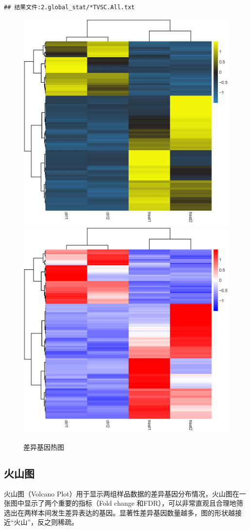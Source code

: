 \documentclass[
]{ctexart}
\begin{document}
\begin{verbatim}
## 结果文件:2.global_stat/*TVSC.All.txt
\end{verbatim}

\begin{figure}[H]

{\centering \includegraphics[width=0.48\linewidth]{./1.picture/heatmap_1} \includegraphics[width=0.48\linewidth]{./1.picture/heatmap_3} 

}

\caption{差异基因热图}\label{fig:unnamed-chunk-9}
\end{figure}

\hypertarget{ux706bux5c71ux56fe}{%
\subsection{火山图}\label{ux706bux5c71ux56fe}}

火山图（Volcano Plot）用于显示两组样品数据的差异基因分布情况，火山图在一张图中显示了两个重要的指标（Fold change 和FDR），可以非常直观且合理地筛选出在两样本间发生差异表达的基因。显著性差异基因数量越多，图的形状越接近``火山''，反之则稀疏。
\end{document}
